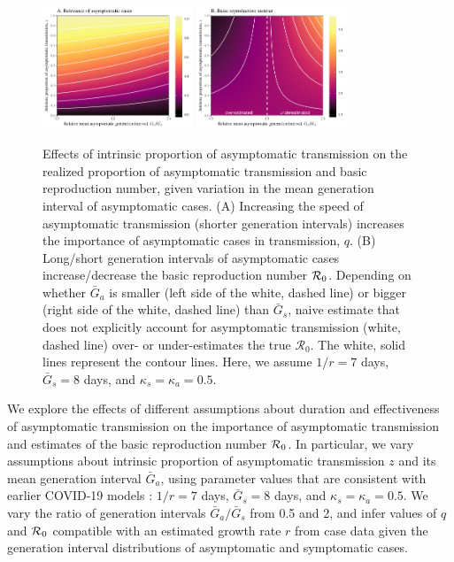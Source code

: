 \begin{figure}[b!]
\begin{center}
\includegraphics[width=0.4\textwidth]{figheatmap.pdf}
\mbox{\hspace{0.05\textwidth}}
\includegraphics[width=0.4\textwidth]{figheatmap_R0.pdf}
\caption{Effects of intrinsic proportion of asymptomatic transmission on the realized proportion of asymptomatic transmission and basic reproduction number, given variation in
the mean generation interval of asymptomatic cases. 
(A) Increasing the speed of asymptomatic transmission (shorter generation intervals) increases the importance of asymptomatic cases in transmission, $q$.
(B) Long/short generation intervals of asymptomatic cases increase/decrease the basic reproduction number ${\cal{R}}_0$.
Depending on whether $\bar G_a$ is smaller (left side of the white, dashed line) or bigger (right side of the white, dashed line) than $\bar G_s$, naive estimate that does not explicitly account for asymptomatic transmission (white, dashed line) over- or under-estimates the true $\mathcal R_0$.
The white, solid lines represent the contour lines.
Here, we assume $1/r=7$ days, $\bar G_s=8$ days, and $\kappa_s=\kappa_a=0.5$.
\label{fig.importance}}
\end{center}
\end{figure}

We explore the effects of different assumptions about duration and effectiveness of asymptomatic transmission on the importance of asymptomatic transmission and estimates of the basic reproduction number ${\cal{R}}_0$. In particular, we vary assumptions about intrinsic proportion of asymptomatic transmission $z$ and its mean generation interval $\bar G_a$, using parameter values that are consistent with earlier COVID-19 models \citep{park_preprint}: $1/r=7$ days, $\bar G_s=8$ days, and $\kappa_s=\kappa_a=0.5$.
We vary the ratio of generation intervals $\bar G_a/\bar G_s$ from 0.5 and 2, and infer values of $q$ and ${\cal{R}}_0$ compatible with an estimated growth rate $r$ from case data given the generation interval distributions of asymptomatic and symptomatic cases.

